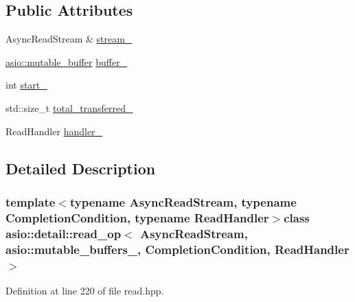 \subsection*{Public Attributes}
\begin{DoxyCompactItemize}
\item 
Async\+Read\+Stream \& \hyperlink{classasio_1_1detail_1_1read__op_3_01_async_read_stream_00_01asio_1_1mutable__buffers__1_00_01_018ff00a3c2aa5481d9cf38a1ea7821a38_acd644587f4903cc3030564bb089d630a}{stream\+\_\+}
\item 
\hyperlink{classasio_1_1mutable__buffer}{asio\+::mutable\+\_\+buffer} \hyperlink{classasio_1_1detail_1_1read__op_3_01_async_read_stream_00_01asio_1_1mutable__buffers__1_00_01_018ff00a3c2aa5481d9cf38a1ea7821a38_a8f3f75c1022ad67fe098a70c807d316e}{buffer\+\_\+}
\item 
int \hyperlink{classasio_1_1detail_1_1read__op_3_01_async_read_stream_00_01asio_1_1mutable__buffers__1_00_01_018ff00a3c2aa5481d9cf38a1ea7821a38_a77d6cc18b93a59e2513beab2d67fafc3}{start\+\_\+}
\item 
std\+::size\+\_\+t \hyperlink{classasio_1_1detail_1_1read__op_3_01_async_read_stream_00_01asio_1_1mutable__buffers__1_00_01_018ff00a3c2aa5481d9cf38a1ea7821a38_a65cce25829008bd8f8c5d0271018c5da}{total\+\_\+transferred\+\_\+}
\item 
Read\+Handler \hyperlink{classasio_1_1detail_1_1read__op_3_01_async_read_stream_00_01asio_1_1mutable__buffers__1_00_01_018ff00a3c2aa5481d9cf38a1ea7821a38_ade92732080a200e0a0b16893e6d7c218}{handler\+\_\+}
\end{DoxyCompactItemize}


\subsection{Detailed Description}
\subsubsection*{template$<$typename Async\+Read\+Stream, typename Completion\+Condition, typename Read\+Handler$>$class asio\+::detail\+::read\+\_\+op$<$ Async\+Read\+Stream, asio\+::mutable\+\_\+buffers\+\_,                           Completion\+Condition, Read\+Handler $>$}



Definition at line 220 of file read.\+hpp.



